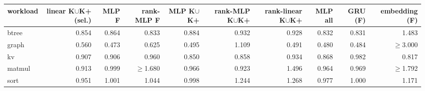 \begin{tabular}{lrrrrrrrrr}
\toprule
workload & linear K$\cup$K{+} (sel.) & MLP F & rank-MLP F & MLP K$\cup$K{+} & rank-MLP K$\cup$K{+} & rank-linear K$\cup$K{+} & MLP all & GRU (F) & embedding (F) \\
\midrule
btree & 0.854 & 0.864 & 0.833 & 0.884 & 0.932 & 0.928 & 0.832 & 0.831 & 1.483 \\
graph & 0.560 & 0.473 & 0.625 & 0.495 & 1.109 & 0.491 & 0.480 & 0.484 & $\geq$3.000 \\
kv & 0.907 & 0.906 & 0.960 & 0.850 & 0.858 & 0.934 & 0.868 & 0.982 & 0.817 \\
matmul & 0.913 & 0.999 & $\geq$1.680 & 0.966 & 0.923 & 1.496 & 0.964 & 0.969 & $\geq$1.792 \\
sort & 0.951 & 1.001 & 1.044 & 0.998 & 1.244 & 1.268 & 0.977 & 1.000 & 1.171 \\
\bottomrule
\end{tabular}
